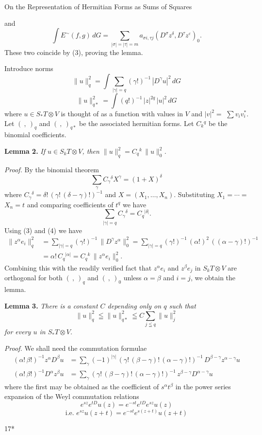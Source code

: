 On the Representation of Hermitian Forms as Sums of Squares 

and
\[ \int E^{\sim}(f,g)\,dG = \sum_{|\sigma|=|\tau|=m} a_{\sigma i,\tau j}(D^{\sigma} z^{\delta}, D^{\tau} z^{\varepsilon})_0 . \]
These two coincide by (3), proving the lemma.

Introduce norms
\[ \|u\|_q^2 = \int \sum_{|\gamma|=q} (\gamma!)^{-1}\, |D^{\gamma} u|^2\, dG \]
\[ \|u\|_{q*}^2 = \int (q!)^{-1}\, |z|^{2q}\, |u|^2\, dG \]
where $u \in S_* T \otimes V$ is thought of as a function with values in $V$ and $|v|^2 =$
$\sum v_i v_i^*$. Let $(\ ,\ )_q$ and $(\ ,\ )_{q*}$ be the associated hermitian forms. Let
$C_k{}^q$ be the binomial coefficients.

\textbf{Lemma 2.} \emph{If $u \in S_k T \otimes V$, then $\|u\|_q^2 = C_q{}^k\, \|u\|_0^2$.}

\emph{Proof.} By the binomial theorem
\[ \sum_{\gamma} C_{\gamma}{}^{\delta} X^{\gamma} = (1+X)^{\delta} \]
where $C_{\gamma}{}^{\delta} = \delta!\,(\gamma!\,(\delta-\gamma)!)^{-1}$ and $X=(X_1,\dots,X_n)$. Substituting $X_1 = \cdots =$
$X_n = t$ and comparing coefficients of $t^q$ we have
\[ \sum_{|\gamma|=q} C_{\gamma}{}^{\delta} = C_q{}^{|\delta|}. \tag{4} \]
Using (3) and (4) we have
\[ \begin{aligned} \|z^{\alpha} e_i\|_q^2 &= \sum_{|\gamma|=q} (\gamma!)^{-1}\, \|D^{\gamma} z^{\alpha}\|_0^2 = \sum_{|\gamma|=q} (\gamma!)^{-1}\, (\alpha!)^2\, ((\alpha-\gamma)!)^{-1} \\
&= \alpha!\, C_q{}^{|\alpha|} = C_q{}^k\, \|z^{\alpha} e_i\|_0^2 . \end{aligned} \]
Combining this with the readily verified fact that $z^{\alpha} e_i$ and $z^{\beta} e_j$ in $S_k T \otimes V$
are orthogonal for both $(\ ,\ )_q$ and $(\ ,\ )_0$ unless $\alpha=\beta$ and $i=j$, we obtain
the lemma.

\textbf{Lemma 3.} \emph{There is a constant $C$ depending only on $q$ such that}
\[ \|u\|_q^2 \leqq \|u\|_{q*}^2 \leqq C \sum_{j \leqq q} \|u\|_j^2 \]
\emph{for every $u$ in $S_* T \otimes V$.}

\emph{Proof.} We shall need the commutation formulae
\[ \begin{aligned} (\alpha!\,\beta!)^{-1} z^{\alpha} D^{\beta} u &= \sum_{\gamma} (-1)^{|\gamma|}\, (\gamma!\,(\beta-\gamma)!\,(\alpha-\gamma)!)^{-1}\, D^{\beta-\gamma} z^{\alpha-\gamma} u \\
(\alpha!\,\beta!)^{-1} D^{\alpha} z^{\beta} u &= \sum_{\gamma} (\gamma!\,(\beta-\gamma)!\,(\alpha-\gamma)!)^{-1}\, z^{\beta-\gamma} D^{\alpha-\gamma} u \end{aligned} \tag{5} \]
where the first may be obtained as the coefficient of $s^{\alpha} t^{\beta}$ in the power
series expansion of the Weyl commutation relations
\[ e^{sz} e^{tD} u(z) = e^{-st} e^{tD} e^{sz} u(z) \]
\[ \text{i.e. } e^{sz} u(z+t) = e^{-st} e^{s(z+t)} u(z+t) \]

17*

